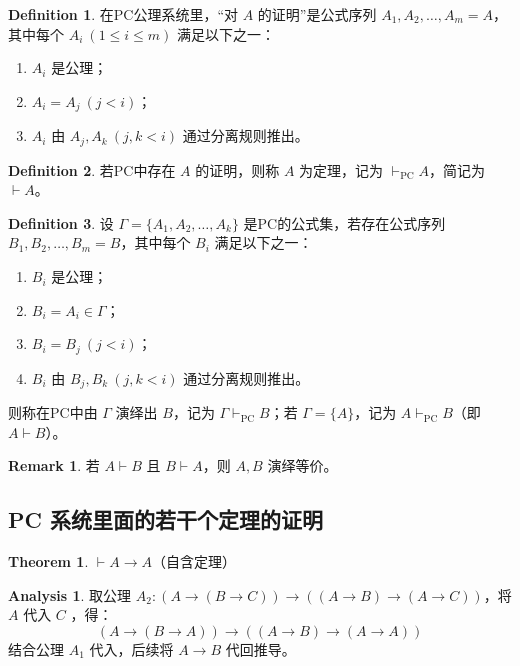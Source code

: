\documentclass[oneside]{book}
\theoremstyle{definition}
\newtheorem{definition}{Definition}[section]
\newtheorem{theorem}{Theorem}[section]
\newtheorem{remark}{Remark}[section]
\newtheorem*{analysis}{Analysis}
\begin{document}
\begin{definition}
	在PC公理系统里，“对 \(A\) 的证明”是公式序列 \( A_1, A_2, \dots, A_m=A \)，其中每个 \( A_i \ (1 \leq i \leq m) \) 满足以下之一：
	\begin{enumerate}
		\item \( A_i \) 是公理；
		\item \( A_i = A_j \ (j < i) \)；
		\item \( A_i \) 由 \( A_j, A_k \ (j,k < i) \) 通过分离规则推出。
	\end{enumerate}
\end{definition}

\begin{definition}
若PC中存在 \( A \) 的证明，则称 \( A \) 为定理，记为 \( \vdash_{\text{PC}} A \)，简记为 \( \vdash A \)。
\end{definition}
\begin{definition}
设 \( \Gamma = \{ A_1, A_2, \dots, A_k \} \) 是PC的公式集，若存在公式序列 \( B_1, B_2, \dots, B_m = B \)，其中每个 \( B_i \) 满足以下之一：
\begin{enumerate}
	\item \( B_i \) 是公理；
	\item \(B_i= A_i \in \Gamma \)；
	\item \( B_i = B_j \ (j < i) \)；
	\item \( B_i \) 由 \( B_j, B_k \ (j,k < i) \) 通过分离规则推出。
\end{enumerate}
则称在PC中由 \( \Gamma \) 演绎出 \( B \)，记为 \( \Gamma \vdash_{\text{PC}} B \)；若 \( \Gamma = \{ A \} \)，记为 \( A \vdash_{\text{PC}} B \)（即 \( A \vdash B \)）。
\end{definition}

\begin{remark}
	若 \( A \vdash B \) 且 \( B \vdash A \)，则 \( A,B \) 演绎等价。
\end{remark}



\subsection{PC 系统里面的若干个定理的证明}
\begin{theorem}
	\( \vdash A \to A \)（自含定理）
\end{theorem}
\begin{analysis}
	取公理 \( A_2: (A \to (B \to C)) \to ((A \to B) \to (A \to C)) \)，将 \( A \) 代入 \(C\) ，得：
	\[
	(A \to (B \to A)) \to ((A \to B) \to (A \to A))
	\]
	结合公理 \( A_1 \) 代入，后续将 \( A \to B \) 代回推导。
\end{analysis}
\end{document}
